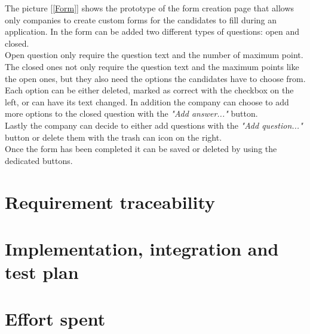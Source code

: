 \documentclass[11pt,twoside]{article}
\begin{document}
The picture [\ref{Form}] shows the prototype of the form creation page that allows only companies to create custom forms for the candidates to fill during an application. In the form can be added two different types of questions: open and closed.\\
Open question only require the question text and the number of maximum point. \\
The closed ones not only require the question text and the maximum points like the open ones, but they also need the options the candidates have to choose from. Each option can be either deleted, marked as correct with the checkbox on the left, or can have its text changed. In addition the company can choose to add more options to the closed question with the \textit{"Add answer..."} button. \\
Lastly the company can decide to either add questions with the \textit{"Add question..."} button or delete them with the trash can icon on the right.\\
Once the form has been completed it can be saved or deleted by using the dedicated buttons.

\newpage

\section{Requirement traceability}

\newpage

\section{Implementation, integration and test plan}

\newpage

\section{Effort spent}
\end{document}
